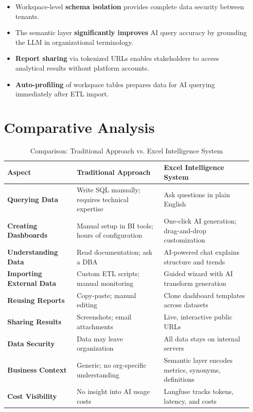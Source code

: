\documentclass[12pt,a4paper]{report}
\begin{document}
\begin{itemize}[leftmargin=1.5cm]
    \item Workspace-level \textbf{schema isolation} provides complete data security between tenants.
    \item The semantic layer \textbf{significantly improves} AI query accuracy by grounding the LLM in organizational terminology.
    \item \textbf{Report sharing} via tokenized URLs enables stakeholders to access analytical results without platform accounts.
    \item \textbf{Auto-profiling} of workspace tables prepares data for AI querying immediately after ETL import.
\end{itemize}

\section{Comparative Analysis}

\begin{table}[H]
\centering
\caption{Comparison: Traditional Approach vs. Excel Intelligence System}
\begin{tabular}{>{\bfseries}p{3.5cm} p{4cm} p{5cm}}
\toprule
\textbf{Aspect} & \textbf{Traditional Approach} & \textbf{Excel Intelligence System} \\
\midrule
Querying Data & Write SQL manually; requires technical expertise & Ask questions in plain English \\
Creating Dashboards & Manual setup in BI tools; hours of configuration & One-click AI generation; drag-and-drop customization \\
Understanding Data & Read documentation; ask a DBA & AI-powered chat explains structure and trends \\
Importing External Data & Custom ETL scripts; manual monitoring & Guided wizard with AI transform generation \\
Reusing Reports & Copy-paste; manual editing & Clone dashboard templates across datasets \\
Sharing Results & Screenshots; email attachments & Live, interactive public URLs \\
Data Security & Data may leave organization & All data stays on internal servers \\
Business Context & Generic; no org-specific understanding & Semantic layer encodes metrics, synonyms, definitions \\
Cost Visibility & No insight into AI usage costs & Langfuse tracks tokens, latency, and costs \\
\bottomrule
\end{tabular}
\label{tab:comparative}
\end{table}
\end{document}
